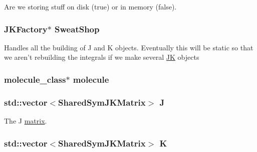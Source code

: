 Are we storing stuff on disk (true) or in memory (false). \hypertarget{classJKBuilder_1_1JK_a09e4ffeb9ba2c95bf981da66beecc033}{
\subsubsection[{SweatShop}]{\setlength{\rightskip}{0pt plus 5cm}JKFactory$\ast$ {\bf SweatShop}}}
\label{classJKBuilder_1_1JK_a09e4ffeb9ba2c95bf981da66beecc033}


Handles all the building of J and K objects. Eventually this will be static so that we aren't rebuilding the integrals if we make several \hyperlink{classJKBuilder_1_1JK}{JK} objects \hypertarget{classJKBuilder_1_1JK_ad646bdee4fc9f601f954b4a98c4da476}{
\subsubsection[{molecule}]{\setlength{\rightskip}{0pt plus 5cm}molecule\_\-class$\ast$ {\bf molecule}}}
\label{classJKBuilder_1_1JK_ad646bdee4fc9f601f954b4a98c4da476}
\hypertarget{classJKBuilder_1_1JK_aa04a91cc219b5dabfce19d5316f96887}{
\subsubsection[{J}]{\setlength{\rightskip}{0pt plus 5cm}std::vector$<$SharedSymJKMatrix$>$ {\bf J}}}
\label{classJKBuilder_1_1JK_aa04a91cc219b5dabfce19d5316f96887}


The J \hyperlink{classJKBuilder_1_1matrix}{matrix}. \hypertarget{classJKBuilder_1_1JK_a5160b673d25f0110d98097f8e7364315}{
\subsubsection[{K}]{\setlength{\rightskip}{0pt plus 5cm}std::vector$<$SharedSymJKMatrix$>$ {\bf K}}}
\label{classJKBuilder_1_1JK_a5160b673d25f0110d98097f8e7364315}


